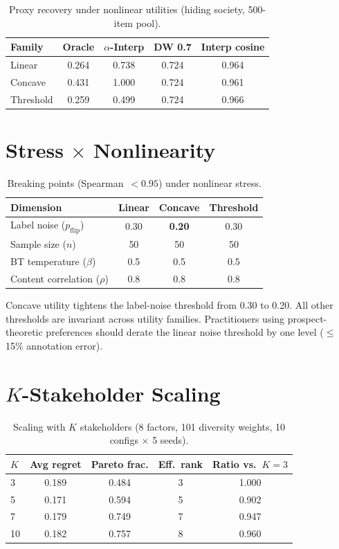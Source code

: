 \documentclass[11pt,letterpaper]{article}
\begin{document}
\begin{table}[H]
\caption{Proxy recovery under nonlinear utilities (hiding society, 500-item pool).}
\label{tab:nonlinear-proxy}
\centering\small
\begin{tabular}{lcccc}
\toprule
Family & Oracle & $\alpha$-Interp & DW 0.7 & Interp cosine \\
\midrule
Linear & 0.264 & 0.738 & 0.724 & 0.964 \\
Concave & 0.431 & 1.000 & 0.724 & 0.961 \\
Threshold & 0.259 & 0.499 & 0.724 & 0.966 \\
\bottomrule
\end{tabular}
\end{table}

\section{Stress $\times$ Nonlinearity}
\label{app:stress}

\begin{table}[H]
\caption{Breaking points (Spearman~$< 0.95$) under nonlinear stress.}
\label{tab:stress-nonlinear}
\centering\small
\begin{tabular}{lccc}
\toprule
Dimension & Linear & Concave & Threshold \\
\midrule
Label noise ($p_{\text{flip}}$) & 0.30 & \textbf{0.20} & 0.30 \\
Sample size ($n$) & 50 & 50 & 50 \\
BT temperature ($\beta$) & 0.5 & 0.5 & 0.5 \\
Content correlation ($\rho$) & 0.8 & 0.8 & 0.8 \\
\bottomrule
\end{tabular}
\end{table}

Concave utility tightens the label-noise threshold from 0.30 to 0.20.
All other thresholds are invariant across utility families. Practitioners
using prospect-theoretic preferences should derate the linear noise
threshold by one level ($\leq$15\% annotation error).

\section{$K$-Stakeholder Scaling}
\label{app:kscaling}

\begin{table}[H]
\caption{Scaling with $K$ stakeholders (8 factors, 101 diversity weights, 10 configs $\times$ 5 seeds).}
\label{tab:kscaling}
\centering\small
\begin{tabular}{lcccc}
\toprule
$K$ & Avg regret & Pareto frac. & Eff.\ rank & Ratio vs.\ $K\!=\!3$ \\
\midrule
3 & 0.189 & 0.484 & 3 & 1.000 \\
5 & 0.171 & 0.594 & 5 & 0.902 \\
7 & 0.179 & 0.749 & 7 & 0.947 \\
10 & 0.182 & 0.757 & 8 & 0.960 \\
\bottomrule
\end{tabular}
\end{table}
\end{document}
